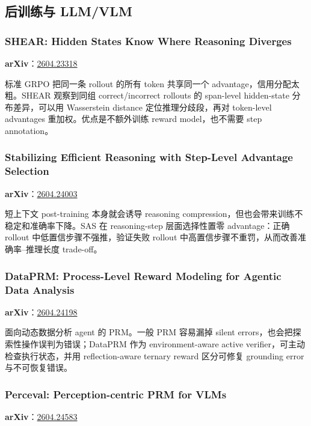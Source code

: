 \subsection{后训练与 LLM/VLM}

\subsubsection{SHEAR: Hidden States Know Where Reasoning Diverges}

\textbf{arXiv}：\href{https://arxiv.org/abs/2604.23318}{2604.23318}

标准 GRPO 把同一条 rollout 的所有 token 共享同一个 advantage，信用分配太粗。SHEAR 观察到同组 correct/incorrect rollouts 的 span-level hidden-state 分布差异，可以用 Wasserstein distance 定位推理分歧段，再对 token-level advantages 重加权。优点是不额外训练 reward model，也不需要 step annotation。

\subsubsection{Stabilizing Efficient Reasoning with Step-Level Advantage Selection}

\textbf{arXiv}：\href{https://arxiv.org/abs/2604.24003}{2604.24003}

短上下文 post-training 本身就会诱导 reasoning compression，但也会带来训练不稳定和准确率下降。SAS 在 reasoning-step 层面选择性置零 advantage：正确 rollout 中低置信步骤不强推，验证失败 rollout 中高置信步骤不重罚，从而改善准确率--推理长度 trade-off。

\subsubsection{DataPRM: Process-Level Reward Modeling for Agentic Data Analysis}

\textbf{arXiv}：\href{https://arxiv.org/abs/2604.24198}{2604.24198}

面向动态数据分析 agent 的 PRM。一般 PRM 容易漏掉 silent errors，也会把探索性操作误判为错误；DataPRM 作为 environment-aware active verifier，可主动检查执行状态，并用 reflection-aware ternary reward 区分可修复 grounding error 与不可恢复错误。

\subsubsection{Perceval: Perception-centric PRM for VLMs}

\textbf{arXiv}：\href{https://arxiv.org/abs/2604.24583}{2604.24583}

